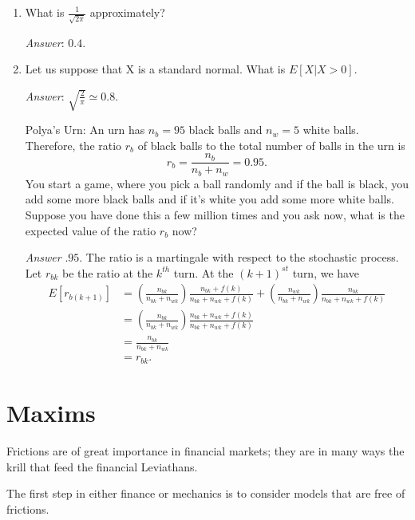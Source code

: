\documentclass{amsart}
\theoremstyle{plain}
\numberwithin{equation}{section}
\begin{document}
\begin{enumerate}
\emph{Answer}: Convert the problem to 
a geometric random variable, with the 
success probability $p = \phi(-30)$. 
Therefore $E[N] = 1/\phi(-30)$. 

\item What is $\frac{1}{\sqrt{2\pi}}$ approximately?

\emph{Answer}: $0.4$.

\item Let us suppose that X is a standard normal. What 
is $E[X|X>0]$.

\emph{Answer}: $\sqrt{\frac{2}{\pi}} \simeq 0.8$.

Polya's Urn: An urn has $n_b=95$ black balls
and $n_w=5$ white balls. Therefore, the ratio 
$r_b$ of black balls to the total number of 
balls in the urn is 
\begin{equation}
r_b = \frac{n_b}{n_b + n_w} = 0.95.
\end{equation}
You start a game, where 
you pick a ball randomly and if the ball
is black, you 
add some more black balls and if it's white you 
add some more white balls. Suppose you have 
done this a few million times and you ask 
now, what is the expected value of the 
ratio $r_b$ now?

\emph{Answer} $.95$. The ratio is a martingale with 
respect to the stochastic process.
Let $r_{bk}$ be the ratio at the $k^{th}$ 
turn. At the $(k+1)^{st}$ turn, we have 
\begin{align}
E[ r_{b(k+1)} ] &= 
\left( \frac{n_{bk}}{n_{bk} + n_{wk}} \right)
\frac{n_{bk} + f(k)}{n_{bk} + n_{wk} + f(k)} +
\left( \frac{n_{wk}}{n_{bk} + n_{wk}} \right)
\frac{n_{bk}}{n_{bk} + n_{wk} + f(k)}\\
&= \left( \frac{n_{bk}}{n_{bk} + n_{wk}} \right)
\frac{n_{bk} + n_{wk} + f(k) }{n_{bk} + n_{wk} + f(k)}\\
&= \frac{n_{bk}}{n_{bk} + n_{wk}}\\
&= r_{bk}.
\end{align}


\end{enumerate}


\section*{Maxims}
Frictions are of great importance in financial markets;
they are in many ways the krill that feed the financial 
Leviathans.

The first step in either finance or mechanics is to 
consider models that are free of frictions. 
\end{document}
